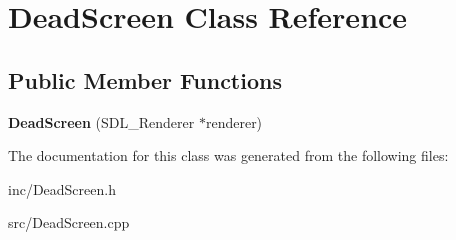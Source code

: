 \hypertarget{class_dead_screen}{}\section{Dead\+Screen Class Reference}
\label{class_dead_screen}
\subsection*{Public Member Functions}
\begin{DoxyCompactItemize}
\item 
\mbox{\label{class_dead_screen_a27992cc6e3912d90925482f99cc4bc5d}} 
{\bfseries Dead\+Screen} (S\+D\+L\+\_\+\+Renderer $\ast$renderer)
\end{DoxyCompactItemize}


The documentation for this class was generated from the following files\+:\begin{DoxyCompactItemize}
\item 
inc/Dead\+Screen.\+h\item 
src/Dead\+Screen.\+cpp\end{DoxyCompactItemize}
